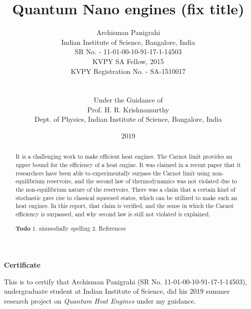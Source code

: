\documentclass[12pt, twoside]{article}
\newcommand\blankpage{%
	\null
	\thispagestyle{empty}%
	\newpage}
\begin{document}
\setpagewiselinenumbers


\title{Quantum Nano engines (fix title)}

\date{2019}



\author{
	Archisman Panigrahi \\
	\footnotesize Indian Institute of Science, Bangalore, India\\
	\footnotesize SR No. - 11-01-00-10-91-17-1-14503\\
	\footnotesize KVPY SA Fellow, 2015\\
	\footnotesize KVPY Registration No. - SA-1510017\\\\\\
	\footnotesize Under the Guidance of\\
	Prof. H. R. Krishnamurthy\\
	\footnotesize Dept. of Physics, Indian Institute of Science, Bangalore, India}


\maketitle

\begin{abstract}

It is a challenging work to make efficient heat engines. The Carnot limit \cite{resnick_halliday} provides an upper bound for the efficiency of a heat engine. It was claimed in a recent paper \cite{klaers} that it researchers have been able to experimentally surpass the Carnot limit using non-equilibrium reservoirs, and the second law of thermodynamics was not violated due to the non-equilibrium nature of the reservoirs. There was a claim that a certain kind of stochastic gave rise to classical squeezed states, which can be utilized to make such an heat engines. In this report, that claim is verified, and the sense in which the Carnot efficiency is surpassed, and why second law is still not violated is explained.

\textbf{Todo} 1. sinusodially spelling
2. References

\end{abstract}


\afterpage{\blankpage}
\begin{center}
	\large{\textbf{Certificate}}
\end{center}
\vspace{2 cm}
This is to certify that Archisman Panigrahi (SR No. 11-01-00-10-91-17-1-14503),
undergraduate student at Indian Institute of Science, did his 2019 summer research
project on \textit{Quantum Heat Engines} under my guidance.\\\\\\
\end{document}
